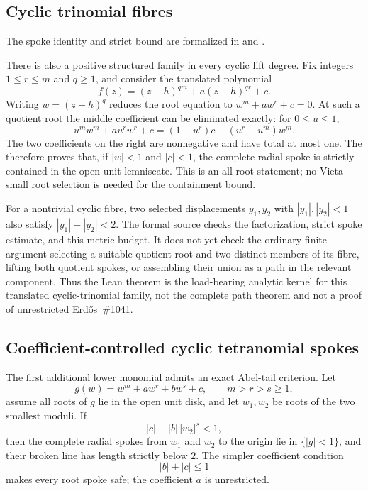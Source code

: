 \documentclass[11pt]{article}
\begin{document}
\subsection*{Cyclic trinomial fibres}

The spoke identity and strict bound are formalized in
and .

There is also a positive structured family in every cyclic lift degree.  Fix
integers $1\le r\le m$ and $q\ge1$, and consider the translated polynomial
\[
 f(z)=(z-h)^{qm}+a(z-h)^{qr}+c.
\]
Writing $w=(z-h)^q$ reduces the root equation to
$w^m+aw^r+c=0$.  At such a quotient root the middle coefficient can be
eliminated exactly: for $0\le u\le1$,
\[
 u^mw^m+au^rw^r+c
   =(1-u^r)c-(u^r-u^m)w^m.
\]
The two coefficients on the right are nonnegative and have total at most one.
The 
therefore proves that, if $|w|<1$ and $|c|<1$, the complete radial spoke
is strictly contained in the open unit lemniscate.  This is an all-root
statement; no Vieta-small root selection is needed for the containment bound.

For a nontrivial cyclic fibre, two selected displacements $y_1,y_2$ with
$|y_1|,|y_2|<1$ also satisfy $|y_1|+|y_2|<2$.  The formal source checks the
factorization, strict spoke estimate, and this metric budget.  It does not yet
check the ordinary finite argument selecting a suitable quotient root and two
distinct members of its fibre, lifting both quotient spokes, or assembling
their union as a path in the relevant component.  Thus the Lean theorem is the
load-bearing analytic kernel for this translated cyclic-trinomial family, not
the complete path theorem and not a proof of unrestricted Erd\H{o}s~\#1041.

\subsection*{Coefficient-controlled cyclic tetranomial spokes}

The first additional lower monomial admits an exact Abel-tail criterion.  Let
\[
  g(w)=w^m+aw^r+bw^s+c,\qquad m>r>s\ge1,
\]
assume all roots of $g$ lie in the open unit disk, and let $w_1,w_2$ be roots
of the two smallest moduli.  If
\[
  |c|+|b|\,|w_2|^s<1,
\]
then the complete radial spokes from $w_1$ and $w_2$ to the origin lie in
$\{|g|<1\}$, and their broken line has length strictly below $2$.  The simpler
coefficient condition
\[
  |b|+|c|\le1
\]
makes every root spoke safe; the coefficient $a$ is unrestricted.
\end{document}
